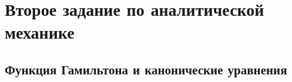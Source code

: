 





% 


% 


% 


% 

% 

% 

\section{Второе задание по аналитической механике}

\subsection{Функция Гамильтона и канонические уравнения}


